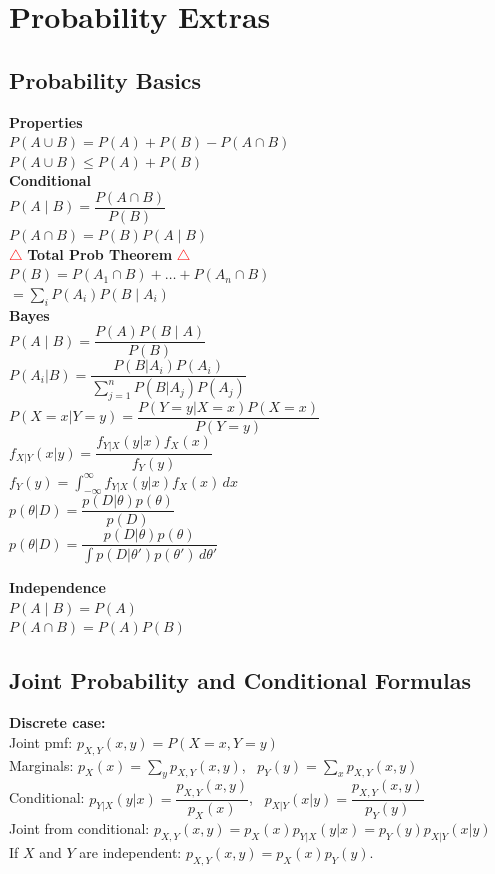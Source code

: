 \section{Probability Extras}
\subsection*{Probability Basics}

\textbf{Properties}\\
$P(A \cup B) = P(A) + P(B) - P(A \cap B)$\\
$P(A \cup B) \le P(A) + P(B)$\\

\textbf{Conditional}\\
$P(A \mid B) = \dfrac{P(A \cap B)}{P(B)}$\\
$P(A \cap B) = P(B)P(A \mid B)$\\

\textcolor{red}{$\triangle$} \textbf{Total Prob Theorem} \textcolor{red}{$\triangle$}\\
$P(B) = P(A_1 \cap B) + \dots + P(A_n \cap B)$\\
$= \sum_i P(A_i) P(B \mid A_i)$\\

\textbf{Bayes}\\
$P(A \mid B) = \dfrac{P(A)P(B \mid A)}{P(B)}$\\
$P(A_i|B) = \dfrac{P(B|A_i)P(A_i)}{\sum_{j=1}^{n} P(B|A_j)P(A_j)}$\\

$P(X=x|Y=y) = \dfrac{P(Y=y|X=x)P(X=x)}{P(Y=y)}$\\
$f_{X|Y}(x|y) = \dfrac{f_{Y|X}(y|x)f_X(x)}{f_Y(y)}$\\
$f_Y(y) = \int_{-\infty}^{\infty} f_{Y|X}(y|x) f_X(x)\,dx$\\

$p(\theta|D) = \dfrac{p(D|\theta)p(\theta)}{p(D)}$\\
$p(\theta|D) = \dfrac{p(D|\theta)p(\theta)}{\int p(D|\theta')p(\theta')\,d\theta'}$


\textbf{Independence}\\
$P(A \mid B) = P(A)$\\
$P(A \cap B) = P(A)P(B)$\\

\subsection*{Joint Probability and Conditional Formulas}
\textbf{Discrete case:}\\
Joint pmf: $p_{X,Y}(x,y) = P(X = x, Y = y)$\\
Marginals: $p_X(x) = \sum_y p_{X,Y}(x,y)$, \ $p_Y(y) = \sum_x p_{X,Y}(x,y)$\\
Conditional: $p_{Y|X}(y|x) = \dfrac{p_{X,Y}(x,y)}{p_X(x)}$, \ $p_{X|Y}(x|y) = \dfrac{p_{X,Y}(x,y)}{p_Y(y)}$\\
Joint from conditional: $p_{X,Y}(x,y) = p_X(x)p_{Y|X}(y|x) = p_Y(y)p_{X|Y}(x|y)$\\
If $X$ and $Y$ are independent: $p_{X,Y}(x,y) = p_X(x)p_Y(y)$.\\

